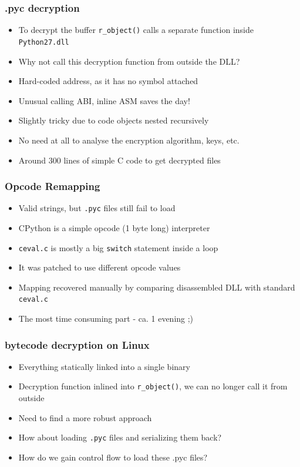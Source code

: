 \documentclass{beamer}
\newcommand\myfont{\fontsize{14}{20}\selectfont}
\begin{document}
\begin{frame}
\frametitle{.pyc decryption}
\begin{itemize}
\itemsep 1.5em
\item{To decrypt the buffer \texttt{r\_object()} calls a separate function inside \texttt{Python27.dll}}
\item{Why not call this decryption function from outside the DLL?}
\item{Hard-coded address, as it has no symbol attached}
\item{Unusual calling ABI, inline ASM saves the day!}
\item{Slightly tricky due to code objects nested recursively}
\item{No need at all to analyse the encryption algorithm, keys, etc.}
\item{Around 300 lines of simple C code to get decrypted files}
\end{itemize}
\end{frame}

\begin{frame}
\frametitle{Opcode Remapping}
\begin{itemize}
\itemsep 1.5em
\item{Valid strings, but \texttt{.pyc} files still fail to load}
\item{CPython is a simple opcode (1 byte long) interpreter}
\item{\texttt{ceval.c} is mostly a big \texttt{switch} statement inside a loop}
\item{It was patched to use different opcode values}
\item{Mapping recovered manually by comparing disassembled DLL with standard \texttt{ceval.c}}
\item{The most time consuming part - ca. 1 evening ;)}
\end{itemize}
\end{frame}

\begin{frame}
\frametitle{bytecode decryption on Linux}
\myfont
\begin{itemize}
\itemsep 1em
\item{Everything statically linked into a single binary}
\item{Decryption function inlined into \texttt{r\_object()}, we can no longer call it from outside}
\item{Need to find a more robust approach}
\item{How about loading \texttt{.pyc} files and serializing them back?}
\item{How do we gain control flow to load these .pyc files?}
\end{itemize}
\end{frame}
\end{document}
